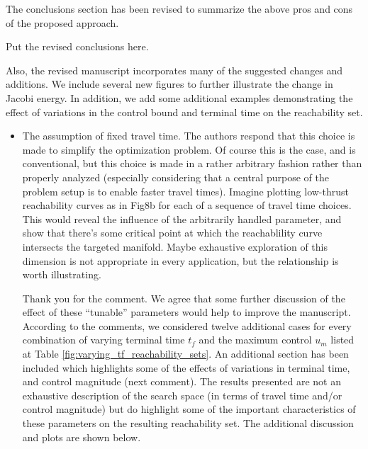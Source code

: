 \documentclass[11pt]{article}
\begin{document}
The conclusions section has been revised to summarize the above pros and cons of the proposed approach. 
\begin{itshape}
	Put the revised conclusions here.
\end{itshape}

Also, the revised manuscript incorporates many of the suggested changes and additions.
We include several new figures to further illustrate the change in Jacobi energy.
In addition, we add some additional examples demonstrating the effect of variations in the control bound and terminal time on the reachability set.

\begin{itemize}
    \item 
        \begin{itshape}
            The assumption of fixed travel time.  The authors respond that this choice is made to simplify the optimization problem.  Of course this is the case, and is conventional, but this choice is made in a rather arbitrary fashion rather than properly analyzed (especially considering that a central purpose of the problem setup is to enable faster travel times).  Imagine plotting low-thrust reachability curves as in Fig8b for each of a sequence of travel time choices.  This would reveal the influence of the arbitrarily handled parameter, and show that there's some critical point at which the reachablility curve intersects the targeted manifold.  Maybe exhaustive exploration of this dimension is not appropriate in every application, but the relationship is worth illustrating.
        \end{itshape}

        Thank you for the comment. 
        We agree that some further discussion of the effect of these ``tunable'' parameters would help to improve the manuscript. 
		According to the comments, we considered twelve additional cases for every combination of varying terminal time $t_f$ and the maximum control $u_m$ listed at Table \ref{fig:varying_tf_reachability_sets}. 
        An additional section has been included which highlights some of the effects of variations in terminal time, and control magnitude (next comment).
        The results presented are not an exhaustive description of the search space (in terms of travel time and/or control magnitude) but do highlight some of the important characteristics of these parameters on the resulting reachability set.
        The additional discussion and plots are shown below.
        

\end{itemize}
\end{document}
